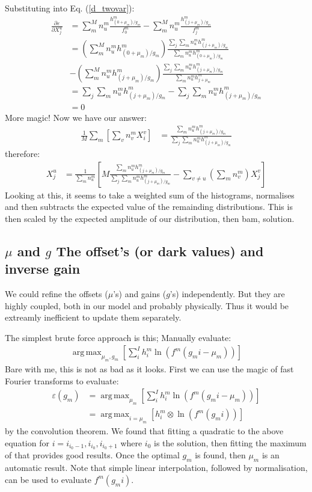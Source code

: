 \documentclass[11pt]{article}
\DeclareMathOperator*{\argmax}{arg\,max}
\begin{document}
Substituting into Eq. (\ref{d_twovar}):
\begin{align}
   \frac{\partial \varepsilon}{\partial X^u_j} &= \sum_m^M n^m_u \frac{ h^m_{(0+\mu_m)/g_m}}{f^m_0}- \sum_m^M n^m_u \frac{ h^m_{(j+\mu_m)/g_m}}{f^m_j} \\
   &=  \left(\sum_m^M n^m_u h^m_{(0+\mu_m)/g_m}\right) \frac{\sum_{j}\sum_m n^m_u h^m_{(j+\mu_m)/g_m}}{\sum_m n^m_u h^m_{(0+\mu_m)/g_m}} \\
   & - \left(\sum_m^M n^m_u h^m_{(j+\mu_m)/g_m}\right) \frac{\sum_{j}\sum_m n^m_u h^m_{(j+\mu_m)/g_m}}{\sum_m n^m_u h^m_{j+\mu_m}} \\
   &= \sum_{j}\sum_m n^m_u h^m_{(j+\mu_m)/g_m} - \sum_{j}\sum_m n^m_u h^m_{(j+\mu_m)/g_m} \\
   &= 0
\end{align}
More magic! Now we have our answer:
\begin{align}
   \frac{1}{M}\sum_m \left[ \sum_v n^m_v X^v_i \right] &= \frac{\sum_m n^m_u h^m_{(j+\mu_m)/g_m}}{\sum_{j}\sum_m n^m_u h^m_{(j+\mu_m)/g_m}}
\end{align}
therefore:
\begin{align}
   X^u_j &= \frac{1}{\sum_m n^m_u}\left[M\frac{\sum_m n^m_u h^m_{(j+\mu_m)/g_m}}{\sum_{j}\sum_m n^m_u h^m_{(j+\mu_m)/g_m}} - \sum_{v\neq u} (\sum_m n^m_v) X^v_j \right] 
\end{align}
Looking at this, it seems to take a weighted sum of the histograms, normalises and then subtracts the expected value of the remainding distributions. This is then scaled by the expected amplitude of our distribution, then bam, solution.






\subsection{$\mu$ and $g$ The offset's (or dark values) and inverse gain}
We could refine the offsets ($\mu$'s) and gains ($g$'s) independently. But they are highly coupled, both in our model and probably physically. Thus it would be extreamly inefficient to update them separately.

The simplest brute force approach is this; Manually evaluate:
\begin{align}
   \argmax_{\mu_m, g_m}\left[ \sum_i^I h^m_i \ln(f^m(g_m i - \mu_m)) \right]
\end{align}  
Bare with me, this is not as bad as it looks. First we can use the magic of fast Fourier transforms to evaluate:
\begin{align}
   \varepsilon(g_m) &= \argmax_{\mu_m}\left[ \sum_i^I h^m_i \ln(f^m(g_m i - \mu_m)) \right] \\
   &= \argmax_{i=\mu_m}\left[ h^m_i \otimes \ln(f^m(g_m i)) \right] 
\end{align}  
by the convolution theorem. We found that fitting a quadratic to the above equation for $i = i_{i_0-1}, i_{i_0}, i_{i_0+1}$ where $i_0$ is the solution, then fitting the maximum of that provides good results. 
Once the optimal $g_m$ is found, then $\mu_m$ is an automatic result. Note that simple linear interpolation, followed by normalisation, can be used to evaluate $f^m(g_m i)$.  
\end{document}
